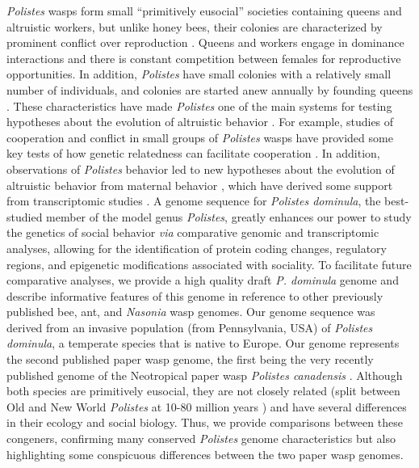 \textit{Polistes} wasps form small ``primitively eusocial'' societies
containing queens and altruistic workers, but unlike honey bees, their
colonies are characterized by prominent conflict over reproduction
\cite{Pardi1948}. Queens and workers
engage in dominance interactions and there is constant competition
between females for reproductive opportunities. In addition,
\textit{Polistes} have small colonies with a relatively small number of
individuals, and colonies are started anew annually by founding queens
\cite{Reeve1991}. These characteristics
have made \textit{Polistes} one of the main systems for testing hypotheses
about the evolution of altruistic behavior \cite{WestEberhard1996}. For example,
studies of cooperation and conflict in small groups of \textit{Polistes}
wasps have provided some key tests of how genetic relatedness can
facilitate cooperation \cite{Hamilton1964}. In addition, observations of \textit{Polistes} behavior led to new
hypotheses about the evolution of altruistic behavior from maternal
behavior \cite{WestEberhard1996},
which have derived some support from transcriptomic studies \cite{Toth2010,Toth2007}. A genome
sequence for \textit{Polistes dominula}, the best-studied member of the
model genus \textit{Polistes}, greatly enhances our power to study the
genetics of social behavior \textit{via} comparative genomic and
transcriptomic analyses, allowing for the identification of protein
coding changes, regulatory regions, and epigenetic modifications
associated with sociality. To facilitate future comparative analyses, we
provide a high quality draft \textit{P. dominula} genome and describe
informative features of this genome in reference to other previously
published bee, ant, and \textit{Nasonia} wasp genomes. Our genome sequence
was derived from an invasive population (from Pennsylvania, USA) of
\textit{Polistes dominula}, a temperate species that is native to Europe.
Our genome represents the second published paper wasp genome, the first
being the very recently published genome of the Neotropical paper wasp
\textit{Polistes canadensis} \cite{PcanGenome}. Although both species are primitively eusocial,
they are not closely related (split between Old and New World
\textit{Polistes} at 10-80 million years \cite{Ezenwa1998}) and
have several differences in their ecology and social biology. Thus, we
provide comparisons between these congeners, confirming many conserved
\textit{Polistes} genome characteristics but also highlighting some
conspicuous differences between the two paper wasp genomes.

